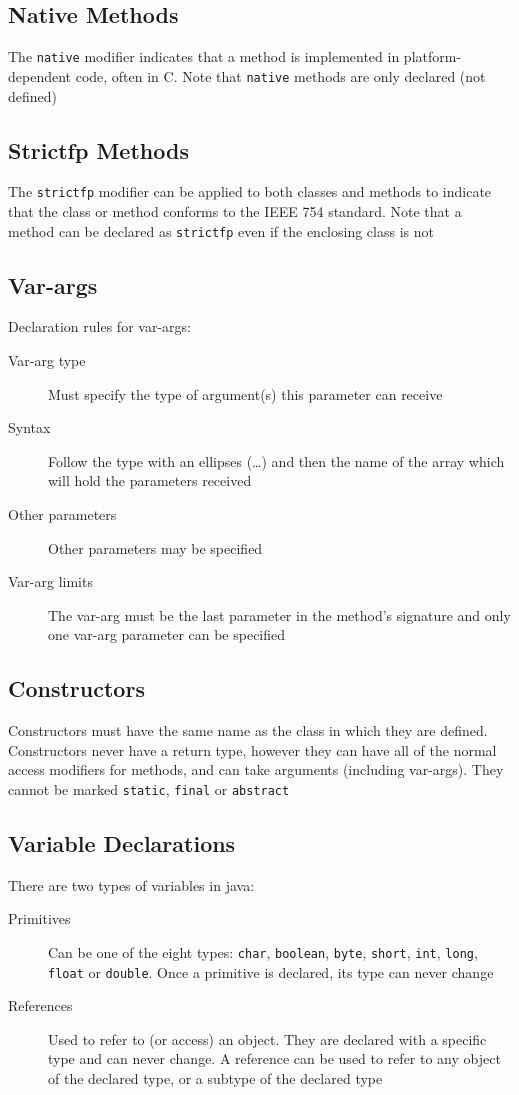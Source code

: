 \subsection{Native Methods}
The \verb#native# modifier indicates that a method is implemented in 
platform-dependent code, often in C. Note that \verb#native# methods are only 
declared (not defined)

\subsection{Strictfp Methods}
The \verb#strictfp# modifier can be applied to both classes and methods to 
indicate that the class or method conforms to the IEEE 754 standard. Note that 
a method can be declared as \verb#strictfp# even if the enclosing class is not

\subsection{Var-args}
Declaration rules for var-args:
\begin{description}
    \item[Var-arg type] Must specify the type of argument(s) this parameter can
    receive
    \item[Syntax] Follow the type with an ellipses (\ldots) and then the name 
    of the array which will hold the parameters received
    \item[Other parameters] Other parameters may be specified
    \item[Var-arg limits] The var-arg must be the last parameter in the
    method's signature and only one var-arg parameter can be 
    specified
\end{description}

\subsection{Constructors}
Constructors must have the same name as the class in which they are defined.
Constructors never have a return type, however they can have all of the normal 
access modifiers for methods, and can take arguments (including var-args). They 
cannot be marked \verb#static#, \verb#final# or \verb#abstract#

\subsection{Variable Declarations}
There are two types of variables in java:
\begin{description}
    \item[Primitives] Can be one of the eight types: \verb#char#, 
    \verb#boolean#, \verb#byte#, \verb#short#, \verb#int#, \verb#long#, 
    \verb#float# or \verb#double#. Once a primitive is declared, its type can 
    never change
    \item[References] Used to refer to (or access) an object. They are declared 
    with a specific type and can never change. A reference can be used to refer 
    to any object of the declared type, or a subtype of the declared type
\end{description}

